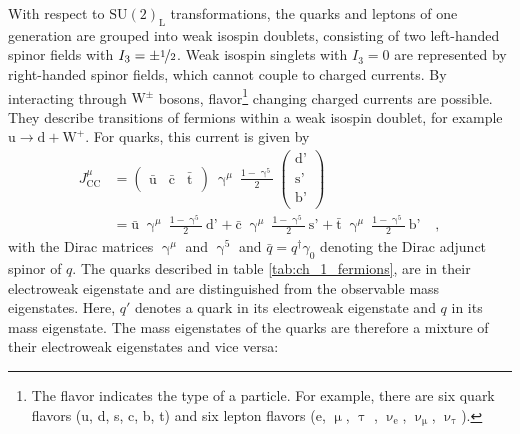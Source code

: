 With respect to $\textrm{SU}(2)_\textrm{L}$ transformations, the quarks and leptons of one generation are grouped into weak isospin doublets, consisting of two left-handed spinor fields with $I_3 = \pm \nicefrac{1}{2}$. Weak isospin singlets with $I_3 = 0$ are represented by right-handed spinor fields, which cannot couple to charged currents. By interacting through $\textrm{W}^\pm$ bosons, flavor\footnote{The flavor indicates the type of a particle. For example, there are six quark flavors (u, d, s, c, b, t) and six lepton flavors (e, $\upmu$, $\uptau$ , $\upnu_\textrm{e}$, $\upnu_\upmu$, $\upnu_\uptau$).} changing charged currents are possible. They describe transitions of fermions within a weak isospin doublet, for example $\textrm{u} \rightarrow \textrm{d} + \textrm{W}^+$. For quarks, this current is given by
\begin{equation}\label{eq:ch_1_J}
\begin{split}
J^\mu_\textrm{CC} &= \begin{pmatrix}\bar{\textrm{u}}_\textrm{} & \bar{\textrm{c}}_\textrm{} & \bar{\textrm{t}}_\textrm{}\end{pmatrix}
	\ \upgamma^\mu \ \frac{1-\upgamma^5}{2} \ \begin{pmatrix} \textrm{d'}_\textrm{}\\\textrm{s'}_\textrm{}\\\textrm{b'}_\textrm{} \end{pmatrix}\\
&= \bar{\textrm{u}}_\textrm{} \ \upgamma^\mu \ \frac{1-\upgamma^5}{2} \ \textrm{d'}_\textrm{} + \bar{\textrm{c}}_\textrm{} \  \upgamma^\mu \ \frac{1-\upgamma^5}{2} \ \textrm{s'}_\textrm{} + \bar{\textrm{t}}_\textrm{} \ \upgamma^\mu \ \frac{1-\upgamma^5}{2} \ \textrm{b'}_\textrm{} \quad ,
\end{split}
\end{equation}
with the Dirac matrices $\upgamma^\mu$ and $\upgamma^5$ and $\bar{q} = q^\dagger \gamma_0$ denoting the Dirac adjunct spinor of $q$. The quarks described in table \ref{tab:ch_1_fermions}, are in their electroweak eigenstate and are distinguished from the observable mass eigenstates. Here, $q'$ denotes a quark in its electroweak eigenstate and $q$ in its mass eigenstate. The mass eigenstates of the quarks are therefore a mixture of their electroweak eigenstates and vice versa:
